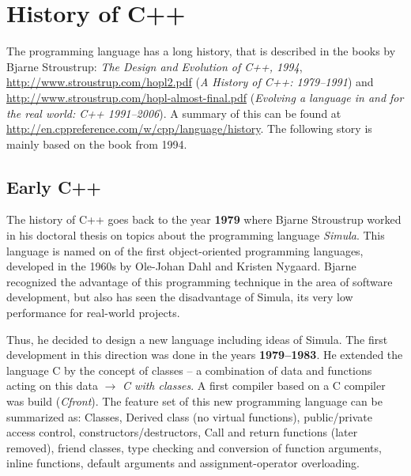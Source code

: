 





\section{History of C++}
The programming language has a long history, that is described in the books by Bjarne Stroustrup: \emph{The Design and Evolution of C++, 1994},
\url{http://www.stroustrup.com/hopl2.pdf} (\emph{A History of C++: 1979--1991}) and \url{http://www.stroustrup.com/hopl-almost-final.pdf}
(\emph{Evolving a language in and for the real world: C++ 1991--2006}). A summary of this can be found at
\url{http://en.cppreference.com/w/cpp/language/history}. The following story is mainly based on the book from 1994.

\subsection{Early C++}
The history of C++ goes back to the year \textbf{1979} where Bjarne Stroustrup worked in his doctoral thesis on topics about the
programming language \emph{Simula}. This language is named on of the first object-oriented programming languages, developed in the
1960s by Ole-Johan Dahl and Kristen Nygaard. Bjarne recognized the advantage of this programming technique in the area of software
development, but also has seen the disadvantage of Simula, its very low performance for real-world projects.

Thus, he decided to design a new language including ideas of Simula. The first development in this direction was done in the years
\textbf{1979--1983}. He extended the language C by the concept of classes -- a combination of data and functions acting on this data
$\rightarrow$ \textit{C with classes}. A first compiler based on a C compiler was build (\textit{Cfront}). The feature set of this new
programming language can be summarized as: Classes, Derived class (no virtual functions), public/private access control,
constructors/destructors, Call and return functions (later removed), friend classes, type checking and conversion of function arguments,
inline functions, default arguments and assignment-operator overloading.

